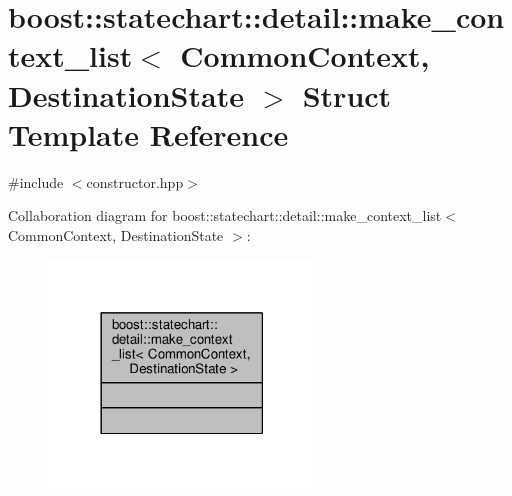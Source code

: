 \hypertarget{structboost_1_1statechart_1_1detail_1_1make__context__list}{}\section{boost\+:\+:statechart\+:\+:detail\+:\+:make\+\_\+context\+\_\+list$<$ Common\+Context, Destination\+State $>$ Struct Template Reference}
\label{structboost_1_1statechart_1_1detail_1_1make__context__list}


{\ttfamily \#include $<$constructor.\+hpp$>$}



Collaboration diagram for boost\+:\+:statechart\+:\+:detail\+:\+:make\+\_\+context\+\_\+list$<$ Common\+Context, Destination\+State $>$\+:
\nopagebreak
\begin{figure}[H]
\begin{center}
\leavevmode
\includegraphics[width=201pt]{structboost_1_1statechart_1_1detail_1_1make__context__list__coll__graph}
\end{center}
\end{figure}
